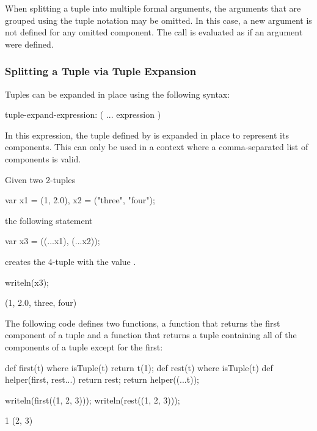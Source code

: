 When splitting a tuple into multiple formal arguments, the arguments
that are grouped using the tuple notation may be omitted.  In this
case, a new argument is not defined for any omitted component.  The
call is evaluated as if an argument were defined.

\subsubsection{Splitting a Tuple via Tuple Expansion}
\label{Tuple_Expansion}

Tuples can be expanded in place using the following syntax:
\begin{syntax}
tuple-expand-expression:
  ( ... expression )
\end{syntax}
In this expression, the tuple defined by  is expanded
in place to represent its components.  This can only be used in a
context where a comma-separated list of components is valid.

\begin{example}
\begin{chapelpre}
\end{chapelpre}
Given two 2-tuples
\begin{chapel}
var x1 = (1, 2.0), x2 = ("three", "four");
\end{chapel}
the following statement
\begin{chapel}
var x3 = ((...x1), (...x2));
\end{chapel}
creates the 4-tuple  with the value .
\begin{chapelpost}
writeln(x3);
\end{chapelpost}
\begin{chapeloutput}
(1, 2.0, three, four)
\end{chapeloutput}
\end{example}

\begin{example}
\begin{chapelpre}
\end{chapelpre}
The following code defines two functions, a function  that
returns the first component of a tuple and a function  that
returns a tuple containing all of the components of a tuple except for
the first:
\begin{chapel}
def first(t) where isTuple(t) {
  return t(1);
}
def rest(t) where isTuple(t) {
  def helper(first, rest...)
    return rest;
  return helper((...t));
}
\end{chapel}
\begin{chapelpost}
writeln(first((1, 2, 3)));
writeln(rest((1, 2, 3)));
\end{chapelpost}
\begin{chapeloutput}
1
(2, 3)
\end{chapeloutput}
\end{example}

